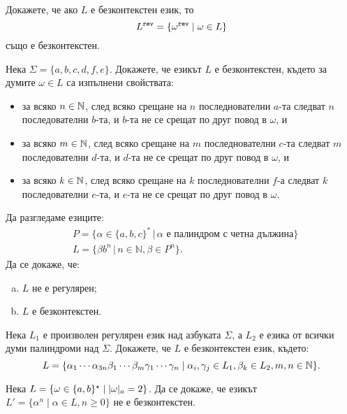 \begin{problem}
  Докажете, че ако $L$ е безконтекстен език, то 
  \[L^{\texttt{rev}} = \{\omega^{\texttt{rev}} \mid \omega \in L\}\]
  също е безконтекстен.
\end{problem}


\begin{problem}
  Нека $\Sigma = \{a,b,c,d,f,e\}$.
  Докажете, че езикът $L$ е безконтекстен, където за думите $\omega \in L$ са изпълнени свойствата:
  \begin{itemize}[-]
  \item 
    за всяко $n\in\mathbb{N}$, след всяко срещане на $n$ последнователни $a$-та
    следват $n$ последователни $b$-та, и $b$-та не се срещат по друг повод в $\omega$, и
  \item
    за всяко $m\in\mathbb{N}$, след всяко срещане на $m$ последнователни $c$-та
    следват $m$ последователни $d$-та, и $d$-та не се срещат по друг повод в $\omega$, и
  \item
    за всяко $k\in\mathbb{N}$, след всяко срещане на $k$ последнователни $f$-а
    следват $k$ последователни $e$-та, и $e$-та не се срещат по друг повод в $\omega$.
  \end{itemize}
\end{problem}

\begin{problem}
  Да разгледаме езиците:
  \begin{align*}
    & P = \{\alpha\in\{a,b,c\}^*\,|\, \alpha \text{ е палиндром с четна дължина}\} \\
    & L =  \{\beta b^n\,|\, n\in\mathbb{N}, \beta\in P^n\}.
  \end{align*}
  Да се докаже, че:
  \begin{enumerate}[a)]
  \item 
    $L$ не е регулярен;
  \item 
    $L$ е безконтекстен.
  \end{enumerate}
\end{problem}

\begin{problem}
  Нека $L_1$ е произволен регулярен език над азбуката $\Sigma$, 
  а $L_2$ е езика от всички думи палиндроми над $\Sigma$.
  Докажете, че $L$ е безконтекстен език, където:
  \[L = \{\alpha_1 \cdots\alpha_{3n}\beta_1\cdots\beta_m\gamma_1\cdots\gamma_n \mid \alpha_i,\gamma_j \in L_1, \beta_k\in L_2, m,n \in \mathbb{N}\}.\]
\end{problem}

\begin{problem}
  Нека $L = \{\omega\in\{a,b\}^\star \mid \vert{\omega}\vert_{a} = 2\}$.
  Да се докаже, че езикът $L' = \{\alpha^n \mid \alpha\in L, n \geq 0\}$ не е безконтекстен.
\end{problem}


